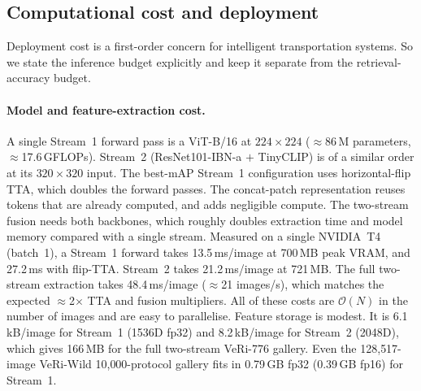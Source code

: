 \subsection{Computational cost and deployment}
\label{sec:cost}
Deployment cost is a first-order concern for intelligent transportation systems. So we state the inference budget explicitly and keep it separate from the retrieval-accuracy budget.

\paragraph{Model and feature-extraction cost.} A single Stream~1 forward pass is a ViT-B/16 at $224\times224$ ($\approx$86\,M parameters, $\approx$17.6\,GFLOPs). Stream~2 (ResNet101-IBN-a $+$ TinyCLIP) is of a similar order at its $320\times320$ input. The best-mAP Stream~1 configuration uses horizontal-flip TTA, which doubles the forward passes. The concat-patch representation reuses tokens that are already computed, and adds negligible compute. The two-stream fusion needs both backbones, which roughly doubles extraction time and model memory compared with a single stream. Measured on a single NVIDIA~T4 (batch~1), a Stream~1 forward takes 13.5\,ms/image at 700\,MB peak VRAM, and 27.2\,ms with flip-TTA. Stream~2 takes 21.2\,ms/image at 721\,MB. The full two-stream extraction takes 48.4\,ms/image ($\approx$21 images/s), which matches the expected $\approx$2$\times$ TTA and fusion multipliers. All of these costs are $\mathcal{O}(N)$ in the number of images and are easy to parallelise. Feature storage is modest. It is 6.1\,kB/image for Stream~1 (1536D fp32) and 8.2\,kB/image for Stream~2 (2048D), which gives 166\,MB for the full two-stream VeRi-776 gallery. Even the 128{,}517-image VeRi-Wild 10{,}000-protocol gallery fits in 0.79\,GB fp32 (0.39\,GB fp16) for Stream~1.
